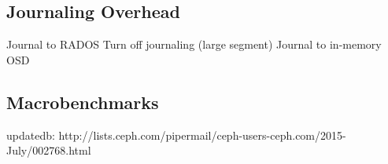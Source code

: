%
%
%
%
%
%
%
%
%
%
%

\subsection{Journaling Overhead}

Journal to RADOS
Turn off journaling (large segment)
Journal to in-memory OSD 

\subsection{Macrobenchmarks}
updatedb: http://lists.ceph.com/pipermail/ceph-users-ceph.com/2015-July/002768.html


